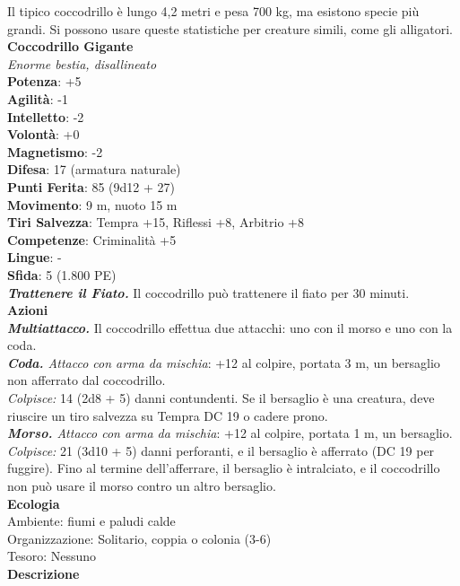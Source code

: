 \begin{multicols}{2}
Il tipico coccodrillo è lungo 4,2 metri e pesa 700 kg, ma esistono specie più grandi. Si possono usare queste statistiche per creature simili, come gli alligatori. \\


\medskip\textbf{Coccodrillo Gigante}\\
\emph{Enorme bestia, disallineato}\\
\textbf{Potenza}: +5\\
\textbf{Agilità}: -1\\
\textbf{Intelletto}: -2\\
\textbf{Volontà}: +0\\
\textbf{Magnetismo}: -2\\
\textbf{Difesa}: 17 (armatura naturale)\\
\textbf{Punti Ferita}: 85 (9d12 + 27)\\
\textbf{Movimento}: 9 m, nuoto 15 m\\
\textbf{Tiri Salvezza}: Tempra +15, Riflessi +8, Arbitrio +8 \\
\textbf{Competenze}: Criminalità +5\\
\textbf{Lingue}: -\\
\textbf{Sfida}: 5 (1.800 PE)\smallskip\\
\emph{\textbf{Trattenere il Fiato.}} Il coccodrillo può trattenere il fiato per 30 minuti.\\
\smallskip\textbf{Azioni}\\
\emph{\textbf{Multiattacco.}} Il coccodrillo effettua due attacchi: uno con il morso e uno con la coda.\\
\emph{\textbf{Coda.} Attacco con arma da mischia}: +12 al colpire, portata 3 m, un bersaglio non afferrato dal coccodrillo.\\
\emph{Colpisce:} 14 (2d8 + 5) danni contundenti. Se il bersaglio è una creatura, deve riuscire un tiro salvezza su Tempra DC  19 o cadere prono.\\
\emph{\textbf{Morso.} Attacco con arma da mischia}: +12 al colpire, portata 1 m, un bersaglio.\\
\emph{Colpisce:} 21 (3d10 + 5) danni perforanti, e il bersaglio è afferrato (DC  19 per fuggire). Fino al termine dell'afferrare, il bersaglio è intralciato, e il coccodrillo non può usare il morso contro un altro bersaglio.\\
\textbf{Ecologia}\\
Ambiente: fiumi e paludi calde\\
Organizzazione: Solitario, coppia o colonia (3-6)\\
Tesoro: Nessuno\\
\textbf{Descrizione}\\


\end{multicols}

